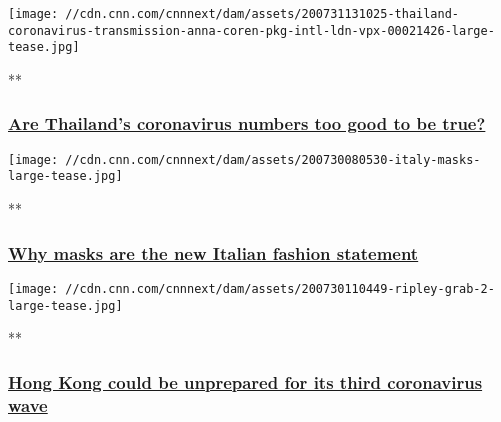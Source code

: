 \href{/videos/world/2020/07/31/thailand-coronavirus-transmission-anna-coren-pkg-intl-ldn-vpx.cnn/video/playlists/coronavirus-intl/}{}

\texttt{[image: //cdn.cnn.com/cnnnext/dam/assets/200731131025-thailand-coronavirus-transmission-anna-coren-pkg-intl-ldn-vpx-00021426-large-tease.jpg]}

**

\hypertarget{are-thailands-coronavirus-numbers-too-good-to-be-true--1}{%
\subsubsection{\texorpdfstring{\href{/videos/world/2020/07/31/thailand-coronavirus-transmission-anna-coren-pkg-intl-ldn-vpx.cnn/video/playlists/coronavirus-intl/}{Are
Thailand's coronavirus numbers too good to be true?
}}{Are Thailand's coronavirus numbers too good to be true? }}\label{are-thailands-coronavirus-numbers-too-good-to-be-true--1}}

\href{/videos/world/2020/07/30/italy-mask-wearing-pandemic-nadeau-pkg-vpx.cnn/video/playlists/coronavirus-intl/}{}

\texttt{[image: //cdn.cnn.com/cnnnext/dam/assets/200730080530-italy-masks-large-tease.jpg]}

**

\hypertarget{why-masks-are-the-new-italian-fashion-statement}{%
\subsubsection{\texorpdfstring{\href{/videos/world/2020/07/30/italy-mask-wearing-pandemic-nadeau-pkg-vpx.cnn/video/playlists/coronavirus-intl/}{Why
masks are the new Italian fashion
statement}}{Why masks are the new Italian fashion statement}}\label{why-masks-are-the-new-italian-fashion-statement}}

\href{/videos/world/2020/07/30/hong-kong-third-wave-will-ripley-pkg-intl-ldn-vpx.cnn/video/playlists/coronavirus-intl/}{}

\texttt{[image: //cdn.cnn.com/cnnnext/dam/assets/200730110449-ripley-grab-2-large-tease.jpg]}

**

\hypertarget{hong-kong-could-be-unprepared-for-its-third-coronavirus-wave}{%
\subsubsection{\texorpdfstring{\href{/videos/world/2020/07/30/hong-kong-third-wave-will-ripley-pkg-intl-ldn-vpx.cnn/video/playlists/coronavirus-intl/}{Hong
Kong could be unprepared for its third coronavirus
wave}}{Hong Kong could be unprepared for its third coronavirus wave}}\label{hong-kong-could-be-unprepared-for-its-third-coronavirus-wave}}

